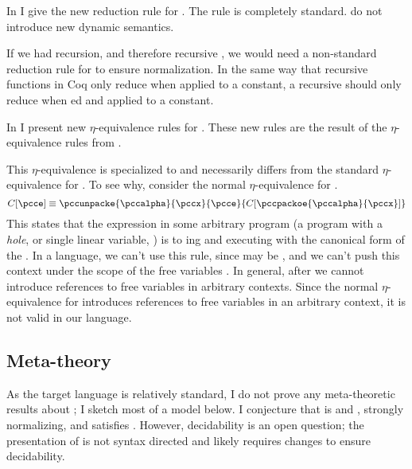 \FigCoCCCRed
In  I give the new reduction rule for .
The rule is completely standard.
 do not introduce new dynamic semantics.

\begin{digression}
  If we had recursion, and therefore recursive , we would need a
  non-standard reduction rule for  to ensure normalization.
  In the same way that recursive functions in Coq only reduce when applied to a
  constant, a recursive  should only reduce when
  ed and applied to a constant.
\end{digression}

\FigCoCCCEquiv
In  I present new \(\eta\)-equivalence rules for
.
These new rules are the result of  the
\(\eta\)-equivalence rules from \pccslang.

This \(\eta\)-equivalence is specialized to  and necessarily
differs from the standard \(\eta\)-equivalence for .
To see why, consider the normal \(\eta\)-equivalence for .
\begin{displaymath}
  C[\pcce] \equiv \pccunpacke{\pccalpha}{\pccx}{\pcce}{C[\pccpackoe{\pccalpha}{\pccx}]}\\
\end{displaymath}
This states that the expression \im{\pcce} in some arbitrary program
 (a program with a \emph{hole}, or single linear variable,
\im{\hole}) 
is  to ing \im{\pcce} and executing 
with the canonical form of the 
\im{\pccpackoe{\pccalpha}{\pccx}}.
In a  language, we can't use this rule, since
 may be  \im{\pccnfune{\pccy:\pccA}{\hole}},
and we can't push this context under the scope of the free variables
\im{\pccalpha, \pccx}.
In general, after  we cannot introduce references to
free variables in arbitrary contexts.
Since the normal \(\eta\)-equivalence for  introduces
references to free variables in an arbitrary context, it is not valid in our
 language.

\subsection{Meta-theory}
As the target language is relatively standard, I do not prove any meta-theoretic
results about \pcctlang; I sketch most of a model below.
I conjecture that \pcctlang is  and , strongly
normalizing, and satisfies .
However, decidability is an open question; the presentation of  is not syntax directed and likely requires changes to ensure
decidability.

